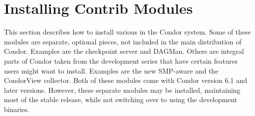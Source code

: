 \section{\label{sec:Contrib-Install}Installing Contrib Modules}

This section describes how to install various 
in the Condor system.
Some of these modules are separate, optional pieces, not included in
the main distribution of Condor.
Examples are the checkpoint server and DAGMan.
Others are integral parts of Condor taken from the development series
that have certain features users might want to install.
Examples are the new SMP-aware  and the CondorView
collector.  
Both of these modules come with Condor version 6.1 and
later versions.
However, 
these separate modules may be installed,
maintaining most of the stable release,
while not
switching over to using the
development binaries.









